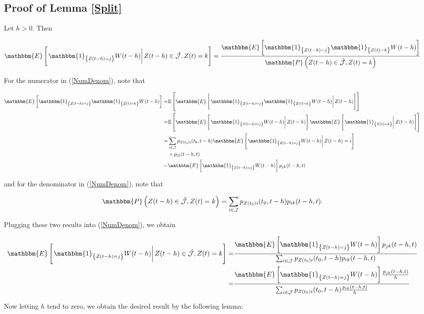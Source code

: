 \documentclass{article}
\newcommand{\1}[1]{\mathbbm{1}_{\left\lbrace #1 \right\rbrace}}
\newcommand{\expec}[1][def]{\mathbbm{E} \left[ #1 \right]}
\newcommand{\econd}[2][def]{\mathbbm{E} \left[ \left. #1 \right| #2 \right]}
\newcommand{\probability}[1][def]{\mathbbm{P} \left( #1 \right)}
\theoremstyle{break}
\theoremstyle{remark}
\numberwithin{equation}{section}
\begin{document}
\begin{appendices}

\section{Proof of Lemma \ref{Split}} \label{SplitProof}

Let $h>0$. Then

\begin{align} \label{NumDenom}
	\econd[\1{Z(t-h)=j} W(t-h)]{Z(t-h) \in \hat{\mathcal{J}}, Z(t) = k} = \frac{\expec[\1{Z(t-h)=j} \1{Z(t)=k} W(t-h)]}{\probability[Z(t-h) \in \hat{\mathcal{J}}, Z(t)=k]}
\end{align}

For the numerator in (\ref{NumDenom}), note that 

\begin{align*}
	\expec[\1{Z(t-h)=j} \1{Z(t)=k} W(t-h)] =& \mathbb{E} \left[ \econd[\1{Z(t-h)=j} \1{Z(t)=k} W(t-h)]{Z(t-h)} \right] \\
	=& \mathbb{E} \left[ \econd[\1{Z(t-h)=j} W(t-h)]{Z(t-h)} \econd[\1{Z(t)=k}]{Z(t-h)} \right] \\
	=& \sum_{i \in \mathcal{J}} p_{Z(t_0)i}(t_0,t-h) \econd[\1{Z(t-h)=j} W(t-h)]{Z(t-h)=i} \\
	&\times p_{ik}(t-h,t) \\
	=& \expec[\1{Z(t-h)=j} W(t-h)] p_{jk}(t-h,t)
\end{align*}

and for the denominator in (\ref{NumDenom}), note that 


\begin{align*}
	\probability[Z(t-h) \in \hat{\mathcal{J}}, Z(t)=k] = \sum_{i \in \mathcal{J}} p_{Z(t_0)i}(t_0,t-h) p_{ik}(t-h,t).
\end{align*}

Plugging these two results into (\ref{NumDenom}), we obtain

\begin{align*}
	\econd[\1{Z(t-h)=j} W(t-h)]{Z(t-h) \in \hat{\mathcal{J}}, Z(t) = k} =& \frac{\expec[\1{Z(t-h)=j} W(t-h)] p_{jk}(t-h,t)}{\sum_{i \in \mathcal{J}} p_{Z(t_0)i}(t_0,t-h) p_{ik}(t-h,t)} \\
	=& \frac{\expec[\1{Z(t-h)=j} W(t-h)] \frac{p_{jk}(t-h,t)}{h}}{\sum_{i \in \mathcal{J}} p_{Z(t_0)i}(t_0,t-h) \frac{p_{ik}(t-h,t)}{h}} \\
\end{align*}

Now letting $h$ tend to zero, we obtain the desired result by the following lemma:


\end{appendices}
\end{document}
